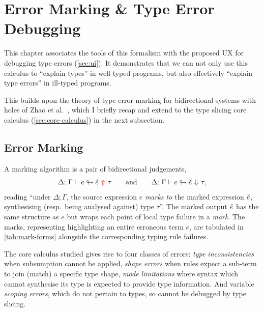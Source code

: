 \section{Error Marking \& Type Error Debugging}
\label{sec:marking}

\sectionlegend

This chapter associates the tools of this formalism with the proposed UX for debugging type errors (\cref{sec:ui}). It demonstrates that we can not only use this calculus to ``explain types'' in well-typed programs, but also effectively ``explain type errors'' in ill-typed programs.

This builds upon the theory of type error marking for bidirectional systems with holes of Zhao et al.~\cite{Marking2024}, which I briefly recap and extend to the type slicing core calculus (\cref{sec:core-calculus}) in the next subsection.
 
\subsection{\yo Error Marking}
\label{sec:marking-calculus}

A marking algorithm is a pair of bidirectional judgements,
\[
  \synmark{e}{\chk e}{\tau}
  \qquad\text{and}\qquad
  \anamark{e}{\chk e}{\tau},
\]
reading ``under $\Delta;\Gamma$, the source expression $e$ \textit{marks
to} the marked expression $\check{e}$, synthesising (resp.\ being analysed
against) type $\tau$''. The marked output $\check{e}$ has the same
structure as $e$ but wraps each point of local type failure in a \emph{mark}. The marks, representing highlighting an entire erroneous term $e$, are tabulated in \cref{tab:mark-forms} alongside the corresponding typing rule failures. 

The core calculus studied gives rise to four classes of errors: \textit{type inconsistencies} when subsumption cannot be applied, \textit{shape errors} when rules expect a sub-term to join (match) a specific type shape, \textit{mode limitations} where syntax which cannot synthesise its type is expected to provide type information. And variable \textit{scoping errors}, which do not pertain to types, so cannot be debugged by type slicing.


